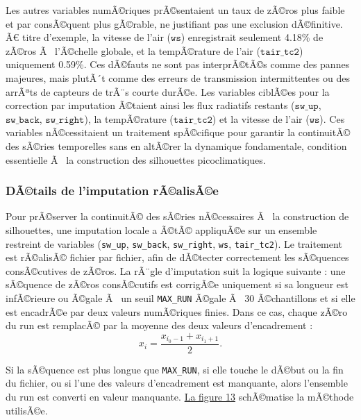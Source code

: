 \documentclass{article}
\begin{document}
Les autres variables numÃ©riques prÃ©sentaient un taux de zÃ©ros plus faible et par consÃ©quent plus gÃ©rable, ne justifiant pas une exclusion dÃ©finitive. Ã€ titre d'exemple, la vitesse de l'air ($\texttt{ws}$) enregistrait seulement 4.18\% de zÃ©ros Ã  l'Ã©chelle globale, et la tempÃ©rature de l'air ($\texttt{tair\_tc2}$) uniquement 0.59\%. Ces dÃ©fauts ne sont pas interprÃ©tÃ©s comme des pannes majeures, mais plutÃ´t comme des erreurs de transmission intermittentes ou des arrÃªts de capteurs de trÃ¨s courte durÃ©e. Les variables ciblÃ©es pour la correction par imputation Ã©taient ainsi les flux radiatifs restants ($\texttt{sw\_up}$, $\texttt{sw\_back}$, $\texttt{sw\_right}$), la tempÃ©rature ($\texttt{tair\_tc2}$) et la vitesse de l'air ($\texttt{ws}$). Ces variables nÃ©cessitaient un traitement spÃ©cifique pour garantir la continuitÃ© des sÃ©ries temporelles sans en altÃ©rer la dynamique fondamentale, condition essentielle Ã  la construction des silhouettes picoclimatiques.

\subsubsection{DÃ©tails de l'imputation rÃ©alisÃ©e}

Pour prÃ©server la continuitÃ© des sÃ©ries nÃ©cessaires Ã  la construction de silhouettes, une imputation locale a Ã©tÃ© appliquÃ©e sur un ensemble restreint de variables (\texttt{sw\_up}, \texttt{sw\_back}, \texttt{sw\_right}, \texttt{ws}, \texttt{tair\_tc2}). Le traitement est rÃ©alisÃ© fichier par fichier, afin de dÃ©tecter correctement les sÃ©quences consÃ©cutives de zÃ©ros. La rÃ¨gle d'imputation suit la logique suivante : une sÃ©quence de zÃ©ros consÃ©cutifs est corrigÃ©e uniquement si sa longueur est infÃ©rieure ou Ã©gale Ã  un seuil \texttt{MAX\_RUN} Ã©gale Ã  30 Ã©chantillons et si elle est encadrÃ©e par deux valeurs numÃ©riques finies. Dans ce cas, chaque zÃ©ro du run est remplacÃ© par la moyenne des deux valeurs d'encadrement :
\[
x_{i} = \frac{x_{i_0-1} + x_{i_1+1}}{2}.
\]
\vspace{0.05cm}

Si la sÃ©quence est plus longue que \texttt{MAX\_RUN}, si elle touche le dÃ©but ou la fin du fichier, ou si l'une des valeurs d'encadrement est manquante, alors l'ensemble du run est converti en valeur manquante. \hyperref[fig:schema_imputation_zero]{La figure 13} schÃ©matise la mÃ©thode utilisÃ©e.
\end{document}
